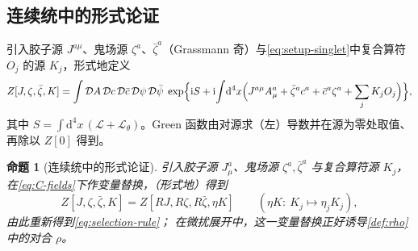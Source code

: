\documentclass[UTF8,a4paper,11pt,fontset=fandol]{ctexart}
\theoremstyle{cplain}
\newtheorem{proposition}[theorem]{命题}
\theoremstyle{cdefinition}
\theoremstyle{cremark}
\numberwithin{equation}{section}
\newcommand{\dd}{\mathrm{d}}                         %
\newcommand{\ii}{\mathrm{i}}                        %
\begin{document}
\subsection{连续统中的形式论证}\label{sec:nonpert-formal}

引入胶子源 $J^{a\mu}$、鬼场源 $\zeta^a$、$\bar\zeta^a$（Grassmann 奇）与\cref{eq:setup-singlet}中复合算符 $O_j$ 的源 $K_j$，形式地定义
\begin{equation}\label{eq:np-Z}
Z[J,\zeta,\bar\zeta,K]=\int\mathcal DA\,\mathcal Dc\,\mathcal D\bar c\,\mathcal D\psi\,\mathcal D\bar\psi\;
\exp\Bigl\{\ii S+\ii\!\int\!\dd^4x\Bigl(J^{a\mu}A^a_\mu+\bar\zeta^ac^a+\bar c^a\zeta^a+\sum_jK_jO_j\Bigr)\Bigr\},
\end{equation}
其中 $S=\int\dd^4x\,(\mathcal L+\mathcal L_\theta)$。Green 函数由对源求（左）导数并在源为零处取值、再除以 $Z[0]$ 得到。

\begin{proposition}[连续统中的形式论证]\label{prop:formal}
引入胶子源 $J^a_\mu$、鬼场源 $\zeta^a,\bar\zeta^a$ 与复合算符源 $K_j$，在\cref{eq:C-fields}下作变量替换，（形式地）得到
\begin{equation}\label{eq:Z-symmetry}
Z[J,\zeta,\bar\zeta,K]=Z[RJ,R\zeta,R\bar\zeta,\eta K]\qquad(\eta K:\ K_j\mapsto\eta_jK_j),
\end{equation}
由此重新得到\cref{eq:selection-rule}；
在微扰展开中，这一变量替换正好诱导\cref{def:rho}中的对合 $\rho$。
\end{proposition}
\end{document}

